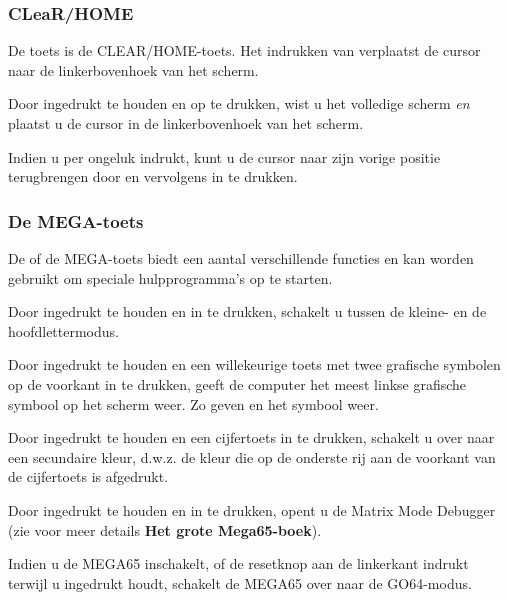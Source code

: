 \subsubsection{CLeaR/HOME}
De toets  is de CLEAR/HOME-toets. Het indrukken van  verplaatst de cursor naar de linkerbovenhoek van het scherm.

Door  ingedrukt te houden en op  te drukken, wist u het volledige scherm {\it en} plaatst u de cursor in de linkerbovenhoek van het scherm.

Indien u per ongeluk  indrukt, kunt u de cursor naar zijn vorige positie terugbrengen door  en vervolgens  in te drukken.

\subsubsection{De MEGA-toets}
De \megasymbolkey of de MEGA-toets biedt een aantal verschillende functies en kan worden gebruikt om speciale hulpprogramma's op te starten.

Door  ingedrukt te houden en \megasymbolkey in te drukken, schakelt u tussen de kleine- en de hoofdlettermodus.

Door \megasymbolkey ingedrukt te houden en een willekeurige toets met twee grafische symbolen op de voorkant in te drukken, geeft de computer het meest linkse grafische symbool op het scherm weer. Zo geven \megasymbolkey en  het symbool  weer.

Door \megasymbolkey ingedrukt te houden en een cijfertoets in te drukken, schakelt u over naar een secundaire kleur, d.w.z. de kleur die op de onderste rij aan de voorkant van de cijfertoets is afgedrukt.

Door \megasymbolkey ingedrukt te houden en  in te drukken, opent u de Matrix Mode Debugger (zie voor meer details {\bf Het grote Mega65-boek}).

Indien u de MEGA65 inschakelt, of de resetknop aan de linkerkant indrukt terwijl u \megasymbolkey ingedrukt houdt, schakelt de MEGA65 over naar de GO64-modus.


